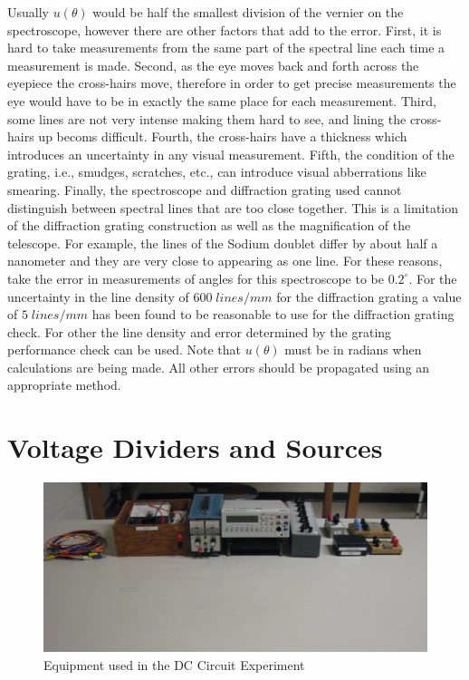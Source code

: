 \documentclass[12pt, a4paper, oneside, openright, titlepage]{book}
\begin{document}
Usually $u(\theta)$ would be half the smallest division of the vernier on the spectroscope, however there are other factors that add to the error. First, it is hard to take measurements from the same part of the spectral line each time a measurement is made. Second, as the eye moves back and forth across the eyepiece the cross-hairs move, therefore in order to get precise measurements the eye would have to be in exactly the same place for each measurement. Third, some lines are not very intense making them hard to see, and lining the cross-hairs up becoms difficult. Fourth, the cross-hairs have a thickness which introduces an uncertainty in any visual measurement. Fifth, the condition of the grating, i.e., smudges, scratches, etc., can introduce visual abberrations like smearing. Finally, the spectroscope and diffraction grating used cannot distinguish between spectral lines that are too close together. This is a limitation of the diffraction grating construction as well as the magnification of the telescope. For example, the lines of the Sodium doublet differ by about half a nanometer and they are very close to appearing as one line. For these reasons, take the error in measurements of angles for this spectroscope to be $0.2^{\circ}$. For the uncertainty in the line density of $600\;lines/mm$ for the diffraction grating a value of $5\;lines/mm$ has been found to be reasonable to use for the diffraction grating check. For other the line density and error determined by the grating performance check can be used. Note that $u(\theta)$ must be in radians when calculations are being made. All other errors should be propagated using an appropriate method.



\chapter{Voltage Dividers and Sources}


\begin{figure}[H]
    \centering
    \includegraphics[scale = 0.8]{Images/Divid1.PNG}
    \caption{Equipment used in the DC Circuit Experiment}
    \label{fig:DCSetup}
\end{figure}
\end{document}
